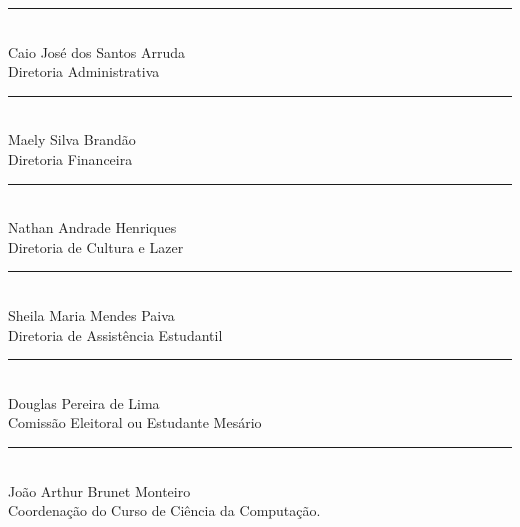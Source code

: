 \documentclass[11pt,letterpaper]{article}
\begin{document}
\begin{multicols}{2}
  \begin{center}
  \rule[]{3in}{0.1pt} \\
  Caio José dos Santos Arruda\\ Diretoria Administrativa\\
  \end{center}

  \begin{center}
  \rule[]{3in}{0.1pt} \\
  Maely Silva Brandão \\ Diretoria Financeira\\
  \end{center}

  \begin{center}
  \rule[]{3in}{0.1pt} \\
  Nathan Andrade Henriques \\ Diretoria de Cultura e Lazer\\
  \end{center}

  \begin{center}
  \rule[]{3in}{0.1pt} \\
  Sheila Maria Mendes Paiva\\ Diretoria de Assistência Estudantil\\
  \end{center}

\end{multicols}









\begin{center}
  \rule[]{3in}{0.1pt} \\
  Douglas Pereira de Lima\\ Comissão Eleitoral ou Estudante Mesário\\
\end{center}

\begin{center}
\rule[]{3in}{0.1pt} \\
João Arthur Brunet Monteiro\\ Coordenação do Curso de Ciência da Computação.\\
\end{center}
\end{document}
